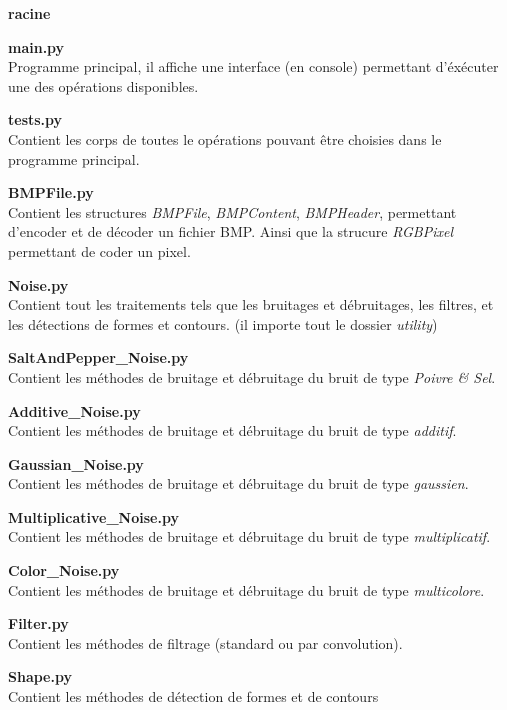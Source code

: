 \documentclass{article}
\begin{document}
		\begin{description}
			\item \textbf{racine}
			\begin{description}
				\item \textbf{main.py} \hfill \\
					Programme principal, il affiche une interface (en console) permettant d'éxécuter une des opérations disponibles.
				\item \textbf{tests.py} \hfill \\
					Contient les corps de toutes le opérations pouvant être choisies dans le programme principal.
				\item \textbf{BMPFile.py} \hfill \\
					Contient les structures \emph{BMPFile}, \emph{BMPContent}, \emph{BMPHeader}, permettant d'encoder et de décoder un fichier BMP. Ainsi que la strucure \emph{RGBPixel} permettant de coder un pixel.
				\item \textbf{Noise.py} \hfill \\
					Contient tout les traitements tels que les bruitages et débruitages, les filtres, et les détections de formes et contours. (il importe tout le dossier \emph{utility})
				
				\begin{description}
					\item \textbf{SaltAndPepper\_Noise.py} \hfill \\
						Contient les méthodes de bruitage et débruitage du bruit de type \emph{Poivre \& Sel}.
					\item \textbf{Additive\_Noise.py} \hfill \\
						Contient les méthodes de bruitage et débruitage du bruit de type \emph{additif}.
					\item \textbf{Gaussian\_Noise.py} \hfill \\
						Contient les méthodes de bruitage et débruitage du bruit de type \emph{gaussien}.
					\item \textbf{Multiplicative\_Noise.py} \hfill \\
						Contient les méthodes de bruitage et débruitage du bruit de type \emph{multiplicatif}.
					\item \textbf{Color\_Noise.py} \hfill \\
						Contient les méthodes de bruitage et débruitage du bruit de type \emph{multicolore}.
					\item \textbf{Filter.py} \hfill \\
						Contient les méthodes de filtrage (standard ou par convolution).
					\item \textbf{Shape.py} \hfill \\
						Contient les méthodes de détection de formes et de contours
	
				\end{description}
			\end{description}
		\end{description}
		
\end{document}
